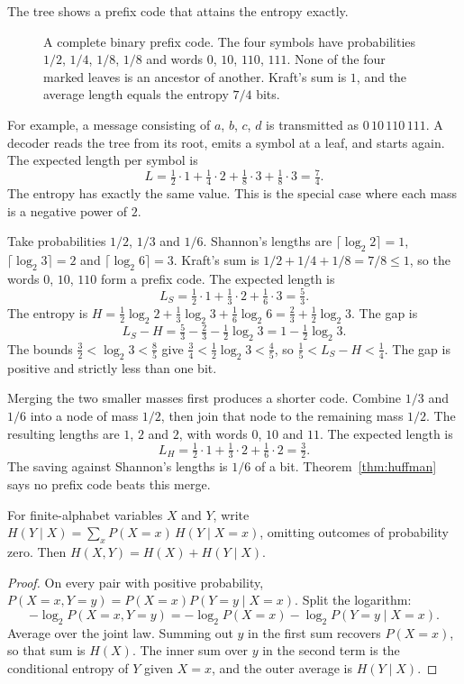The tree shows a prefix code that attains the entropy exactly.

\begin{figure}[ht]
\centering
{}
\caption{A complete binary prefix code. The four symbols have probabilities $1/2$, $1/4$, $1/8$, $1/8$ and words $0$, $10$, $110$, $111$. None of the four marked leaves is an ancestor of another. Kraft's sum is $1$, and the average length equals the entropy $7/4$ bits.}
\label{fig:prefix}
\end{figure}

For example, a message consisting of $a$, $b$, $c$, $d$ is transmitted as $0\,10\,110\,111$. A decoder reads the tree from its root, emits a symbol at a leaf, and starts again. The expected length per symbol is
\[
L=\tfrac12\cdot1+\tfrac14\cdot2+\tfrac18\cdot3+\tfrac18\cdot3=\tfrac74.
\]
The entropy has exactly the same value. This is the special case where each mass is a negative power of $2$.

\begin{examplex}
Take probabilities $1/2$, $1/3$ and $1/6$. Shannon's lengths are $\lceil\log_2 2\rceil=1$, $\lceil\log_2 3\rceil=2$ and $\lceil\log_2 6\rceil=3$. Kraft's sum is $1/2+1/4+1/8=7/8\le 1$, so the words $0$, $10$, $110$ form a prefix code. The expected length is
\[
 L_S=\tfrac12\cdot 1+\tfrac13\cdot 2+\tfrac16\cdot 3=\tfrac53.
\]
The entropy is $H=\tfrac12\log_2 2+\tfrac13\log_2 3+\tfrac16\log_2 6=\tfrac23+\tfrac12\log_2 3$. The gap is
\[
 L_S-H=\tfrac53-\tfrac23-\tfrac12\log_2 3=1-\tfrac12\log_2 3.
\]
The bounds $\tfrac32<\log_2 3<\tfrac85$ give $\tfrac34<\tfrac12\log_2 3<\tfrac45$, so $\tfrac15<L_S-H<\tfrac14$. The gap is positive and strictly less than one bit.

Merging the two smaller masses first produces a shorter code. Combine $1/3$ and $1/6$ into a node of mass $1/2$, then join that node to the remaining mass $1/2$. The resulting lengths are $1$, $2$ and $2$, with words $0$, $10$ and $11$. The expected length is
\[
 L_H=\tfrac12\cdot 1+\tfrac13\cdot 2+\tfrac16\cdot 2=\tfrac32.
\]
The saving against Shannon's lengths is $1/6$ of a bit. Theorem~\ref{thm:huffman} says no prefix code beats this merge.
\end{examplex}

\begin{proposition}\label{prop:chain}
For finite-alphabet variables $X$ and $Y$, write $H(Y\mid X)=\sum_x P(X=x)\,H(Y\mid X=x)$, omitting outcomes of probability zero. Then $H(X,Y)=H(X)+H(Y\mid X)$.
\end{proposition}
\begin{proof}
On every pair with positive probability, $P(X=x,Y=y)=P(X=x)P(Y=y\mid X=x)$. Split the logarithm:
\[
 -\log_2 P(X=x,Y=y)=-\log_2 P(X=x)-\log_2 P(Y=y\mid X=x).
\]
Average over the joint law. Summing out $y$ in the first sum recovers $P(X=x)$, so that sum is $H(X)$. The inner sum over $y$ in the second term is the conditional entropy of $Y$ given $X=x$, and the outer average is $H(Y\mid X)$.
\end{proof}

